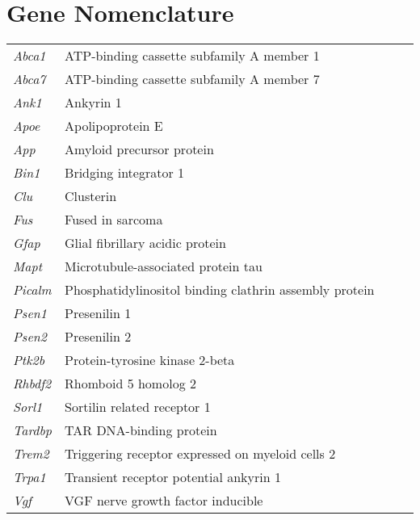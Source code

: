 \chapter*{Gene Nomenclature}

\setlength{\tabcolsep}{12pt}
\begin{tabular}{l p{1.5\linewidth}}
\textit{Abca1}& ATP-binding cassette subfamily A member 1 \\
\textit{Abca7}&  ATP-binding cassette subfamily A member 7 \\
\textit{Ank1} & Ankyrin 1\\
\textit{Apoe}&  Apolipoprotein E \\
\textit{App}& Amyloid precursor protein \\
\textit{Bin1}&Bridging integrator 1 \\
\textit{Clu}&Clusterin \\
\textit{Fus}&Fused in sarcoma \\
\textit{Gfap}&Glial fibrillary acidic protein\\
\textit{Mapt}&Microtubule-associated protein tau \\
\textit{Picalm}&Phosphatidylinositol binding clathrin assembly protein \\
\textit{Psen1}&Presenilin 1 \\
\textit{Psen2}&Presenilin 2 \\
\textit{Ptk2b}&Protein-tyrosine kinase 2-beta \\
\textit{Rhbdf2}&Rhomboid 5 homolog 2 \\
\textit{Sorl1}&Sortilin related receptor 1 \\
\textit{Tardbp}& TAR DNA-binding protein \\
\textit{Trem2}&Triggering receptor expressed on myeloid cells 2 \\
\textit{Trpa1}&Transient receptor potential ankyrin 1 \\
\textit{Vgf}&VGF nerve growth factor inducible \\
\end{tabular}

